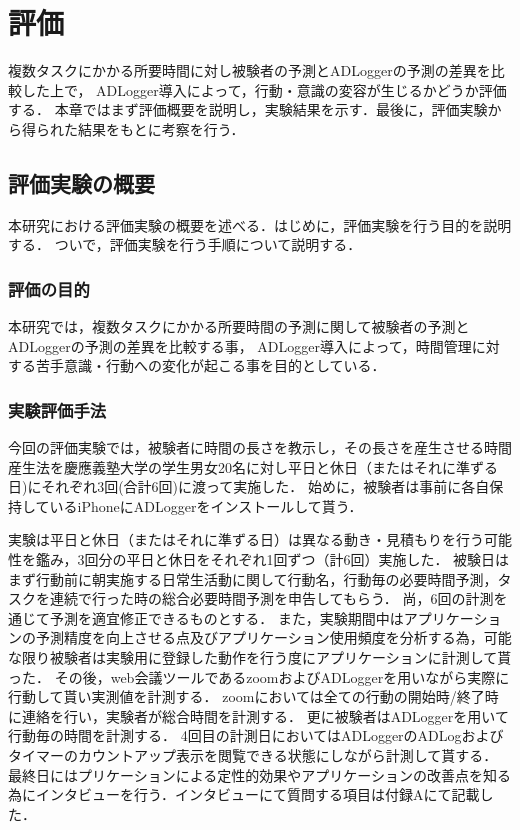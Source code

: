 \chapter{評価}
複数タスクにかかる所要時間に対し被験者の予測とADLoggerの予測の差異を比較した上で，
ADLogger導入によって，行動・意識の変容が生じるかどうか評価する．
本章ではまず評価概要を説明し，実験結果を示す．最後に，評価実験から得られた結果をもとに考察を行う．

\section{評価実験の概要}
本研究における評価実験の概要を述べる．はじめに，評価実験を行う目的を説明する．
ついで，評価実験を行う手順について説明する．

\subsection{評価の目的}
本研究では，複数タスクにかかる所要時間の予測に関して被験者の予測とADLoggerの予測の差異を比較する事，
ADLogger導入によって，時間管理に対する苦手意識・行動への変化が起こる事を目的としている．

\subsection{実験評価手法}
今回の評価実験では，被験者に時間の長さを教示し，その長さを産生させる時間産生法\cite{Oguro1961}\cite{Tayama2018}を慶應義塾大学の学生男女20名に対し平日と休日（またはそれに準ずる日)にそれぞれ3回(合計6回)に渡って実施した．
始めに，被験者は事前に各自保持しているiPhoneにADLoggerをインストールして貰う．

実験は平日と休日（またはそれに準ずる日）は異なる動き・見積もりを行う可能性を鑑み，3回分の平日と休日をそれぞれ1回ずつ（計6回）実施した．
被験日はまず行動前に朝実施する日常生活動に関して行動名，行動毎の必要時間予測，タスクを連続で行った時の総合必要時間予測を申告してもらう．
尚，6回の計測を通じて予測を適宜修正できるものとする．
また，実験期間中はアプリケーションの予測精度を向上させる点及びアプリケーション使用頻度を分析する為，可能な限り被験者は実験用に登録した動作を行う度にアプリケーションに計測して貰った．
その後，web会議ツールであるzoom\cite{zoom}およびADLoggerを用いながら実際に行動して貰い実測値を計測する．
zoomにおいては全ての行動の開始時/終了時に連絡を行い，実験者が総合時間を計測する．
更に被験者はADLoggerを用いて行動毎の時間を計測する．
4回目の計測日においてはADLoggerのADLogおよびタイマーのカウントアップ表示を閲覧できる状態にしながら計測して貰する．
最終日にはプリケーションによる定性的効果やアプリケーションの改善点を知る為にインタビューを行う．インタビューにて質問する項目は付録Aにて記載した．

